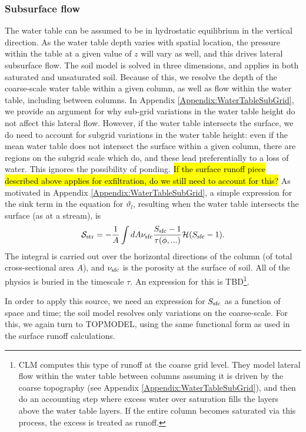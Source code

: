 \documentclass[twoside,10pt]{report}
\begin{document}
\subsubsection{Subsurface flow}
The water table can be assumed to be in hydrostatic equilibrium in the vertical direction. As the water table depth varies with spatial location, the pressure within the table at a given value of $z$ will vary as well, and this drives lateral subsurface flow. The soil model is solved in three dimensions, and applies in both saturated and unsaturated soil. Because of this, we resolve the depth of the coarse-scale water table within a given column, as well as flow within the water table, including between columns. In Appendix \ref{Appendix:WaterTableSubGrid}, we provide an argument for why sub-grid variations in the water table height do not affect this lateral flow. However, if the water table intersects the surface, we do need to account for subgrid variations in the water table height: even if the mean water table does not intersect the surface within a given column, there are regions on the subgrid scale which do, and these lead preferentially to a loss of water. This ignores the possibility of ponding. 
\hl{If the surface runoff piece described above applies for exfiltration, do we still need to account for this?}
As motivated in Appendix \ref{Appendix:WaterTableSubGrid}, a simple expression for the sink term in the equation for $\vartheta_l$, resulting when the water table intersects the surface (as at a stream), is
\begin{align}\label{eq:baseflow_sink}
    \mathcal{S_{\rm str}} &= -\frac{1}{A}\int dA \nu_{\rm sfc}\frac{S_{\rm sfc}-1}{\tau(\phi,...)} \mathcal{H}(S_{\rm sfc} - 1). \nonumber \\
\end{align}
The integral is carried out over the horizontal directions of the column (of total cross-sectional area $A$), and $\nu_{\rm sfc}$ is the porosity at the surface of soil. All of the physics is buried in the timescale $\tau$. An expression for this is TBD\footnote{CLM computes this type of runoff at the coarse grid level. They model lateral flow within the water table between columns assuming it is driven by the coarse topography (see Appendix \ref{Appendix:WaterTableSubGrid}), and then do an accounting step where excess water over saturation fills the layers above the water table layers. If the entire column becomes saturated via this process, the excess is treated as runoff.}. 

In order to apply this source, we need an expression for $S_{\rm sfc}$ as a function of space and time; the soil model resolves only variations on the coarse-scale. For this, we again turn to TOPMODEL, using the same functional form as used in the surface runoff calculations.
\end{document}
